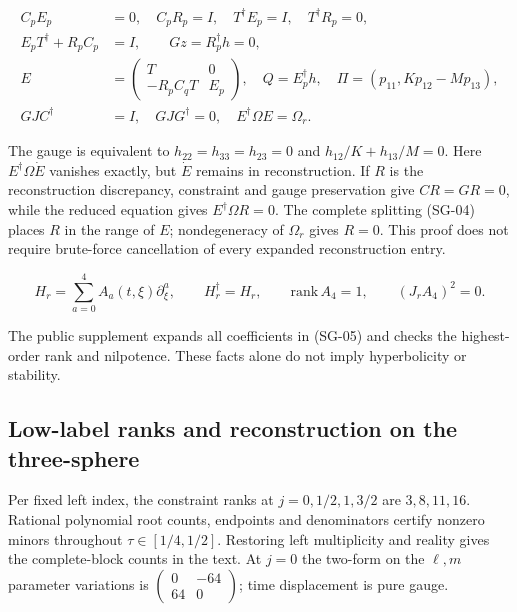 \begin{equation}\tag{SG-04}\label{eq:SG-04}
\begin{aligned}
C_pE_p&=0,\quad C_pR_p=I,\quad T^\dagger E_p=I,\quad T^\dagger R_p=0,\\
E_pT^\dagger+R_pC_p&=I,\qquad Gz=R_p^\dagger h=0,\\
E&=\begin{pmatrix}T&0\\-R_pC_qT&E_p\end{pmatrix},\quad
Q=E_p^\dagger h,\quad\Pi=(p_{11},Kp_{12}-Mp_{13}),\\
GJC^\dagger&=I,\quad GJG^\dagger=0,\quad E^\dagger\Omega E=\Omega_r.
\end{aligned}
\end{equation}

The gauge is equivalent to $h_{22}=h_{33}=h_{23}=0$ and $h_{12}/K+h_{13}/M=0$. Here $E^\dagger\Omega\dot E$ vanishes exactly, but $\dot E$ remains in reconstruction. If $R$ is the reconstruction discrepancy, constraint and gauge preservation give $CR=GR=0$, while the reduced equation gives $E^\dagger\Omega R=0$. The complete splitting (SG-04) places $R$ in the range of $E$; nondegeneracy of $\Omega_r$ gives $R=0$. This proof does not require brute-force cancellation of every expanded reconstruction entry.

\begin{equation}\tag{SG-05}\label{eq:SG-05}
H_r=\sum_{a=0}^4 A_a(t,\xi)\partial_\xi^a,
\qquad H_r^\dagger=H_r,\qquad\mathrm{rank}\,A_4=1,\qquad(J_rA_4)^2=0.
\end{equation}

The public supplement expands all coefficients in (SG-05) and checks the highest-order rank and nilpotence. These facts alone do not imply hyperbolicity or stability.

\subsection{Low-label ranks and reconstruction on the three-sphere}

Per fixed left index, the constraint ranks at $j=0,1/2,1,3/2$ are $3,8,11,16$. Rational polynomial root counts, endpoints and denominators certify nonzero minors throughout $\tau\in[1/4,1/2]$. Restoring left multiplicity and reality gives the complete-block counts in the text. At $j=0$ the two-form on the $\ell,m$ parameter variations is $\left(\begin{smallmatrix}0&-64\\64&0\end{smallmatrix}\right)$; time displacement is pure gauge.

